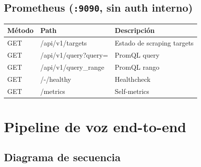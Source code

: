 \documentclass[11pt,a4paper]{article}
\begin{document}
\subsection{Prometheus (\texttt{:9090}, sin auth interno)}

\begin{center}
\begin{tabular}{|l|l|l|}
\hline
\rowcolor{hermesblue}\color{white}\textbf{Método} & \color{white}\textbf{Path} & \color{white}\textbf{Descripción}\\
\hline
GET & /api/v1/targets & Estado de scraping targets\\
GET & /api/v1/query?query= & PromQL query\\
GET & /api/v1/query\_range & PromQL rango\\
GET & /-/healthy & Healthcheck\\
GET & /metrics & Self-metrics\\
\hline
\end{tabular}
\end{center}

\newpage

\section{Pipeline de voz end-to-end}

\subsection{Diagrama de secuencia}
\end{document}
